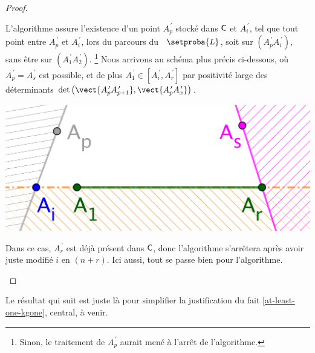 \begin{proof}
\begin{itemize}
        \noindent
        L'algorithme assure l'existence d'un point $A^{\,\prime}_p$ stocké dans $\mathsf{C}$ et  $A^{\,\prime}_i$,
        tel que tout point entre $A^{\,\prime}_p$ et $A^{\,\prime}_i$, lors du parcours du \ncycle\ $\setproba{L}$, soit sur $(A^{\,\prime}_p A^{\,\prime}_i)$,
        sans être sur $(A^{\,\prime}_1 A^{\,\prime}_2)$.%
        \footnote{
            Sinon, le traitement de $A^{\,\prime}_p$ aurait mené à l'arrêt de l'algorithme.
        }
        Nous arrivons au schéma plus précis ci-dessous, où $A^{\,\prime}_p = A^{\,\prime}_s$ est possible,
        et de plus
        $A^{\,\prime}_1 \in [ A^{\,\prime}_i , A^{\,\prime}_r ]$
        par positivité large des déterminants
        $\det \big( \vect{A^{\,\prime}_p A^{\,\prime}_{p+1}}, \vect{A^{\,\prime}_p A^{\,\prime}_x} \big)$.
        \begin{center}
        	\includegraphics[scale=.4]{content/polygon/at-least-one/algo-kgone-terminate-3.png}
        \end{center}
        
        \noindent
        Dans ce cas,
        $A^{\,\prime}_r$ est déjà présent dans $\mathsf{C}$,
        donc l'algorithme s'arrêtera après avoir juste modifié $i$ en $(n + r)$.
        Ici aussi, tout se passe bien pour l'algorithme.
    \end{itemize}
\end{proof}




%

Le résultat qui suit est juste là pour simplifier la justification du fait \ref{at-least-one-kgone}, central, à venir.


